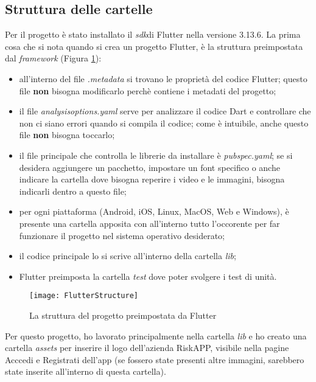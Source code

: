 \subsection{Struttura delle cartelle}
Per il progetto è stato installato il \emph{\gls{sdk}}\glsfirstoccur di Flutter nella versione 3.13.6.\newline  
\newline
La prima cosa che si nota quando si crea un progetto Flutter, è la struttura preimpostata dal \emph{framework} (Figura \ref{fig:directory-flutter}):
\begin{itemize}
    \item all'interno del file \emph{.metadata} si trovano le proprietà del codice Flutter; questo file \textbf{non} bisogna modificarlo perchè contiene i metadati del progetto;
    \item il file \emph{analysis\textunderscore options.yaml} serve per analizzare il codice Dart e controllare che non ci siano errori quando si compila il codice; come è intuibile, anche questo file \textbf{non} bisogna toccarlo;
    \item il file principale che controlla le librerie da installare è \emph{pubspec.yaml}; se si desidera aggiungere un pacchetto, impostare un font specifico o anche indicare la cartella dove bisogna reperire i video e le immagini, bisogna indicarli dentro a questo file;
    \item per ogni piattaforma (Android, iOS, Linux, MacOS, Web e Windows), è presente una cartella apposita con all'interno tutto l'occorente per far funzionare il progetto nel sistema operativo desiderato;
    \item il codice principale lo si scrive all'interno della cartella \emph{lib};
    \item Flutter preimposta la cartella \emph{test} dove poter svolgere i test di unità.
\end{itemize}
\begin{figure}[!h] 
    \centering 
    \texttt{[image: FlutterStructure]} 
    \caption{La struttura del progetto preimpostata da Flutter}
    \label{fig:directory-flutter}
\end{figure}
Per questo progetto, ho lavorato principalmente nella cartella \emph{lib} e ho creato una cartella \emph{assets} per inserire il logo dell'azienda RiskAPP, visibile nella pagine Acccedi e Registrati dell'app (se fossero state presenti altre immagini, sarebbero state inserite all'interno di questa cartella).\newline
